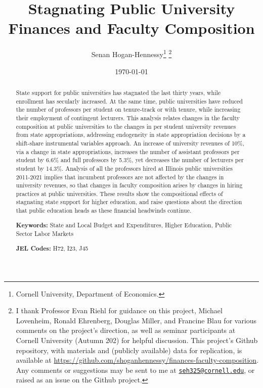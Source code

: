 \documentclass[notitlepage,12pt]{article}
\author{Senan Hogan-Hennessy\thanks{
    Cornell University, Department of Economics.}
    \thanks{I thank Professor Evan Riehl for guidance on this project, Michael Lovenheim, Ronald Ehrenberg, Douglas Miller, and Francine Blau for various comments on the project's direction,
    as well as seminar participants at Cornell University (Autumn 202) for helpful
    discussion.
    This project's Github repository, with materials and (publicly available) data for replication, is available at 
    \url{https://github.com/shoganhennessy/finances-faculty-composition}.
    Any comments or suggestions may be sent to me at \href{mailto:seh325@cornell.edu}{\nolinkurl{seh325@cornell.edu}}, or raised as an issue on the Github project.}}
\title{Stagnating Public University Finances and Faculty Composition}
\date{\today}
\begin{document}
\clearpage \maketitle
\thispagestyle{empty}
\begin{abstract}
\noindent
State support for public universities has stagnated the last thirty years, while enrollment has secularly increased.
At the same time, public universities have reduced the number of professors per student on tenure-track or with tenure, while increasing their employment of contingent lecturers.
This analysis relates changes in the faculty composition at public universities to the changes in per student university revenues from state appropriations, addressing endogeneity in state appropriation decisions by a shift-share instrumental variables approach.
An increase of university revenues of 10\%, via a change in state appropriations, increases the number of assistant professors per student by 6.6\% and full professors by 5.3\%, yet decreases the number of lecturers per student by 14.3\%.
Analysis of all the professors hired at Illinois public universities 2011-2021 implies that incumbent professors are not affected by the changes in university revenues, so that changes in faculty composition arises by changes in hiring practices at public universities.
These results show the compositional effects of stagnating state support for higher education, and raise questions about the direction that public education heads as these financial headwinds continue.

\vspace{0.75cm}
\noindent\textbf{Keywords:}
State and Local Budget and Expenditures,
Higher Education,
Public Sector Labor Markets

\vspace{0.5cm}
\noindent\textbf{JEL Codes:} H72, I23, J45
\end{abstract}
\newpage
\setcounter{page}{1}
\newpage
\doublespacing
\end{document}
